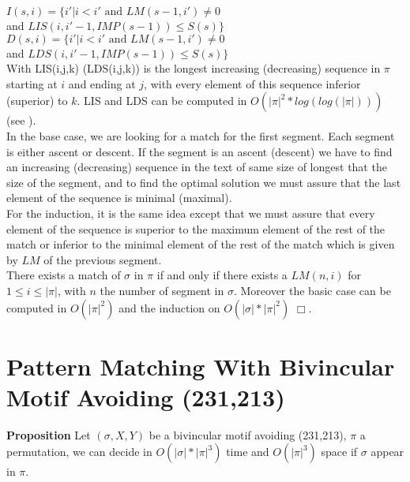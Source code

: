 \documentclass[a4paper]{llncs}
\newcommand{\ptext}{\pi}
\newcommand{\pmotif}{\sigma}
\newcommand{\x}{X}
\newcommand{\y}{Y}
\newcommand{\bmotif}{(\sigma,\x,\y)}
\newcounter{num}
\newcommand{\num}{\stepcounter{num} }
\begin{document}
			$I(s,i)=\{i'|\text{$i<i'$ and $LM(s-1,i')\neq 0$}$ \\
			\indent \indent \indent and  $LIS(i,i'-1,IMP(s-1)) \leq S(s) \}$ \\
			
			$D(s,i)=\{i'|\text{$i<i'$ and $LM(s-1,i')\neq 0$}$ \\
			\indent \indent \indent and  $LDS(i,i'-1,IMP(s-1)) \leq S(s) \}$ \\
					                       
			With LIS(i,j,k) (LDS(i,j,k)) is the longest increasing (decreasing) sequence in $\ptext$ starting at $i$ and ending at $j$,
			with every element of this sequence
			inferior (superior) to $k$. 
			LIS and LDS can be computed in $O(|\ptext|^2*log(log(|\ptext|)))$ (see \cite{Bespamyatnikh00enumeratinglongest}).\\
			
			In the base case, 
			we are looking for a match for the first segment.
			Each segment is either ascent or descent.
			If the segment is an ascent (descent)
			we have to find an increasing (decreasing) sequence
			in the text of same size of longest that 
			the size of the segment,
			and to find the optimal solution 
			we must assure that the last element
			of the sequence is minimal (maximal).\\
			For the induction, it is the same idea
			except that we must assure that 
			every element of the sequence is superior 
			to the maximum element of the rest of the match
			or inferior to the minimal element of the rest of the match
			which is given by $LM$ of
			the previous segment.\\
			
			There exists a match of $\pmotif$ in $\ptext$ if and only if
			there exists a $LM(n,i)$ for $1 \leq i \leq |\ptext|$,
			with $n$ the number of segment in $\pmotif$.
			Moreover the basic case can be computed in $O(|\ptext|^2)$
			and the induction on $O(|\pmotif|*|\ptext|^2)$ $\Box$.
			
					
		\section{Pattern Matching With Bivincular Motif Avoiding (231,213)}	
		
			\textbf{Proposition \num \thenum } Let $\bmotif$ be a bivincular motif 
			avoiding (231,213), 
			$\ptext$ a permutation,
			we can decide in $O(|\pmotif|*|\ptext|^3)$ time
			and $O(|\ptext|^3)$ space
			if $\pmotif$ 
			appear in $\ptext$.\\	
			
\end{document}
